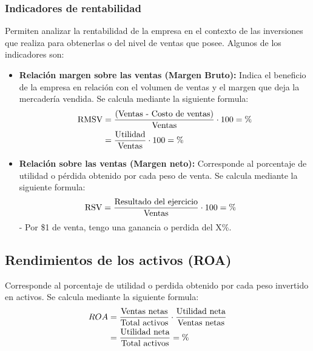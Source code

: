 \documentclass{templateNote}
\begin{document}
\subsubsection{Indicadores de rentabilidad}
\noindent Permiten analizar la rentabilidad de la empresa en el contexto de las inversiones que realiza para obtenerlas o del nivel de ventas que posee. Algunos de los indicadores son:

\begin{itemize}
    \item \textbf{Relación margen sobre las ventas (Margen Bruto):} Indica el beneficio de la empresa en relación con el volumen de ventas y el margen que deja la mercadería vendida. Se calcula mediante la siguiente formula:
    \begin{align*}
        \textnormal{RMSV} &= \frac{\textnormal{(\textnormal{Ventas} - \textnormal{Costo de ventas})}}{\textnormal{Ventas}} \cdot 100 = \% \\
        &= \frac{\textnormal{Utilidad}}{\textnormal{Ventas}} \cdot 100 = \%
    \end{align*}
    \item \textbf{Relación sobre las ventas (Margen neto):} Corresponde al porcentaje de utilidad o pérdida obtenido por cada peso de venta. Se calcula mediante la siguiente formula: 
    \begin{align*}
        \textnormal{RSV} &= \frac{\textnormal{Resultado del ejercicio}}{\textnormal{Ventas}} \cdot 100 = \%
    \end{align*}
    - Por \$1 de venta, tengo una ganancia o perdida del X\%.
\end{itemize}

\subsection{Rendimientos de los activos (ROA)}
\noindent Corresponde al porcentaje de utilidad o perdida obtenido por cada peso invertido en activos. Se calcula mediante la siguiente formula:
\begin{align*}
    ROA &= \frac{\textnormal{Ventas netas}}{\textnormal{Total activos}} \cdot \frac{\textnormal{Utilidad neta}}{\textnormal{Ventas netas}}\\ 
    &= \frac{\textnormal{Utilidad neta}}{\textnormal{Total activos}} = \%
\end{align*}
\end{document}
